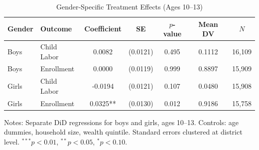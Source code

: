 \begin{table}[H]
\centering
\caption{Gender-Specific Treatment Effects (Ages 10--13)}
\label{tab:gender_divergence}
\begin{threeparttable}
\begin{tabular}{llccccc}
\toprule
Gender & Outcome & Coefficient & SE & $p$-value & Mean DV & $N$ \\
\midrule
Boys & Child Labor & 0.0082 & (0.0121) & 0.495 & 0.1112 & 16,109 \\
Boys & Enrollment & 0.0000 & (0.0119) & 0.999 & 0.8897 & 15,909 \\
Girls & Child Labor & -0.0194 & (0.0121) & 0.107 & 0.0480 & 15,908 \\
Girls & Enrollment & 0.0325** & (0.0130) & 0.012 & 0.9186 & 15,758 \\
\bottomrule
\end{tabular}
\begin{tablenotes}
\footnotesize
\item Notes: Separate DiD regressions for boys and girls, ages 10--13. Controls: age dummies, household size, wealth quintile. Standard errors clustered at district level. $^{***}p<0.01$, $^{**}p<0.05$, $^{*}p<0.10$.
\end{tablenotes}
\end{threeparttable}
\end{table}